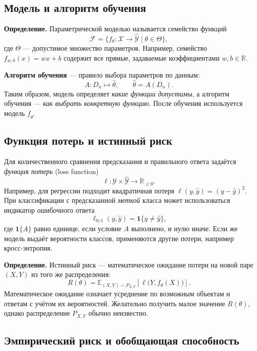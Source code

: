 \documentclass[12pt,a4paper]{article}
\newcommand{\R}{\mathbb{R}}
\begin{document}
\subsection{Модель и алгоритм обучения}

\textbf{Определение.} Параметрической моделью называется семейство функций
\begin{equation}
    \mathcal F=\{f_\theta:\mathcal X\to\widehat{\mathcal Y}
      \mid \theta\in\Theta\},
    \label{eq:model-family}
\end{equation}
где $\Theta$ --- допустимое множество параметров.
Например, семейство $f_{w,b}(x)=wx+b$ содержит все прямые,
задаваемые коэффициентами $w,b\in\R$.

\textbf{Алгоритм обучения} --- правило выбора параметров по данным:
\[
    A:D_n\mapsto\hat\theta,\qquad \hat\theta=A(D_n).
\]
Таким образом, модель определяет \emph{какие функции допустимы},
а алгоритм обучения --- \emph{как выбрать конкретную функцию}.
После обучения используется модель $f_{\hat\theta}$.

\subsection{Функция потерь и истинный риск}

Для количественного сравнения предсказания и правильного ответа задаётся
\emph{функция потерь} (loss function)
\[
    \ell:\mathcal Y\times\widehat{\mathcal Y}\to\R_{\ge0}.
\]
Например, для регрессии подходит квадратичная потеря
$\ell(y,\hat y)=(y-\hat y)^2$.
При классификации с предсказанной \emph{меткой} класса может
использоваться индикатор ошибочного ответа
\[
    \ell_{0/1}(y,\hat y)=\mathbf 1\{y\ne\hat y\},
\]
где $\mathbf 1\{A\}$ равно единице, если условие $A$ выполнено, и нулю
иначе. Если же модель выдаёт вероятности классов, применяются другие потери,
например кросс-энтропия.

\textbf{Определение.} Истинный риск --- математическое ожидание потери на
новой паре $(X,Y)$ из того же распределения:
\begin{equation}
    R(\theta)=\mathbb E_{(X,Y)\sim P_{X,Y}}
    \left[\ell\bigl(Y,f_\theta(X)\bigr)\right].
    \label{eq:true-risk}
\end{equation}
Математическое ожидание означает усреднение по возможным объектам
и ответам с учётом их вероятностей. Желательно получить малое
значение $R(\theta)$, однако распределение $P_{X,Y}$ обычно неизвестно.

\subsection{Эмпирический риск и обобщающая способность}
\end{document}
